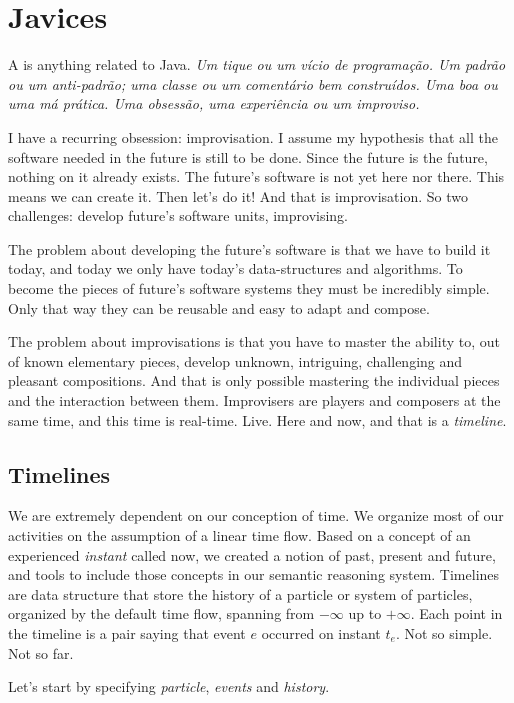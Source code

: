 
\chapter{Javices}
\label{cha:javices}

A \javice is anything related to Java.
%
\emph{ Um tique ou um vício de programação. Um padrão ou um
  anti-padrão; uma classe ou um comentário bem construídos. Uma boa ou
  uma má prática. Uma obsessão, uma experiência ou um improviso.}
\par
I have a recurring obsession: improvisation. I assume my hypothesis
that all the software needed in the future is still to be done. Since
the future is the future, nothing on it already exists. The future's
software is not yet here nor there. This means we can create it. Then
let's do it! And that is improvisation. So two challenges: develop
future's software units, improvising.
\par
The problem about developing the future's software is that we have to
build it today, and today we only have today's data-structures and
algorithms. To become the pieces of future's software systems they
must be incredibly simple. Only that way they can be reusable and easy
to adapt and compose.
\par
The problem about improvisations is that you have to master the
ability to, out of known elementary pieces, develop unknown,
intriguing, challenging and pleasant compositions. And that is only
possible mastering the individual pieces and the interaction between
them. Improvisers are players and composers at the same time, and this
time is real-time. Live. Here and now, and that is a \emph{timeline}.
\par

\section{Timelines}
\label{sec:timelines}

We are extremely dependent on our conception of time. We organize most
of our activities on the assumption of a linear time flow. Based on a
concept of an experienced \emph{instant} called now, we created a
notion of past, present and future, and tools to include those
concepts in our semantic reasoning system.
%
Timelines are data structure that store the history of a particle or
system of particles, organized by the default time flow, spanning from
$-\infty$ up to $+\infty$.
%
Each point in the timeline is a pair  saying that
event $e$ occurred on instant $t_e$. Not so simple. Not so far.
%
\par
Let's start by specifying \emph{particle}, \emph{events} and
\emph{history}.


